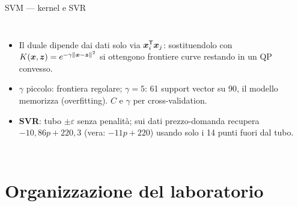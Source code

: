\documentclass[11pt,aspectratio=169]{beamer}
\begin{document}
\begin{frame}{SVM --- kernel e SVR}
\begin{columns}
\small
\begin{itemize}
  \item Il duale dipende dai dati solo via $\boldsymbol{x}_i^{\mathsf T} \boldsymbol{x}_j$: sostituendolo con
        $K(\boldsymbol{x}, \boldsymbol{z}) = e^{-\gamma\|\boldsymbol{x} - \boldsymbol{z}\|^2}$ si ottengono frontiere
        curve \alert{restando in un QP convesso}.
  \item $\gamma$ piccolo: frontiera regolare; $\gamma = 5$: 61 support vector su 90,
        il modello \alert{memorizza} (overfitting). $C$ e $\gamma$ per
        cross-validation.
  \item \textbf{SVR}: tubo $\pm\varepsilon$ senza penalità; sui dati prezzo-domanda
        recupera $-10{,}86p + 220{,}3$ (vera: $-11p + 220$) usando solo i 14 punti
        fuori dal tubo.
\end{itemize}
\end{columns}
\end{frame}

\section{Organizzazione del laboratorio}
\end{document}
